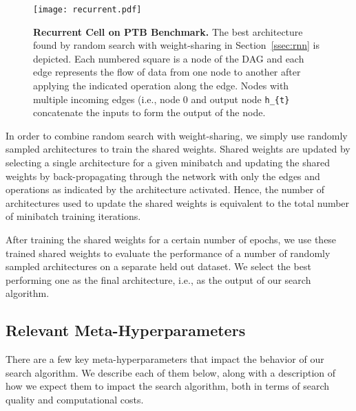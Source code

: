 \documentclass[acmlarge, nonacm]{acmart}
\begin{document}
\begin{figure}
    \centering
    \texttt{[image: recurrent.pdf]}
    \caption{\textbf{Recurrent Cell on PTB Benchmark.}  The best architecture found by random search with weight-sharing in Section~\ref{ssec:rnn} is depicted. Each numbered square is a node of the DAG and each edge represents the flow of data from one node to another after applying the indicated operation along the edge.  Nodes with multiple incoming edges (i.e., node 0 and output node \texttt{h\_\{t\}} concatenate the inputs to form the output of the node.  }
    \label{fig:rnn_cell}
\end{figure}

In order to combine random search with weight-sharing, we simply use randomly sampled architectures to train the shared weights.  Shared weights are updated by selecting a single architecture for a given minibatch and updating the shared weights by back-propagating through the network with only the edges and operations as indicated by the architecture activated.  Hence, the number of architectures used to update the shared weights is equivalent to the total number of minibatch training iterations.  

After training the shared weights for a certain number of epochs, we use these trained shared weights to evaluate the performance of a number of randomly sampled architectures on a separate held out dataset. We select the best performing one as the final architecture, i.e., as the output of our search algorithm.

\subsection{Relevant Meta-Hyperparameters}
\label{ssec:relevant_hps}

There are a few  key meta-hyperparameters that impact the behavior of our search algorithm. We describe each of them below, along with a  description of how we expect them to impact the search algorithm, both in terms of search quality and computational costs. 
\end{document}
